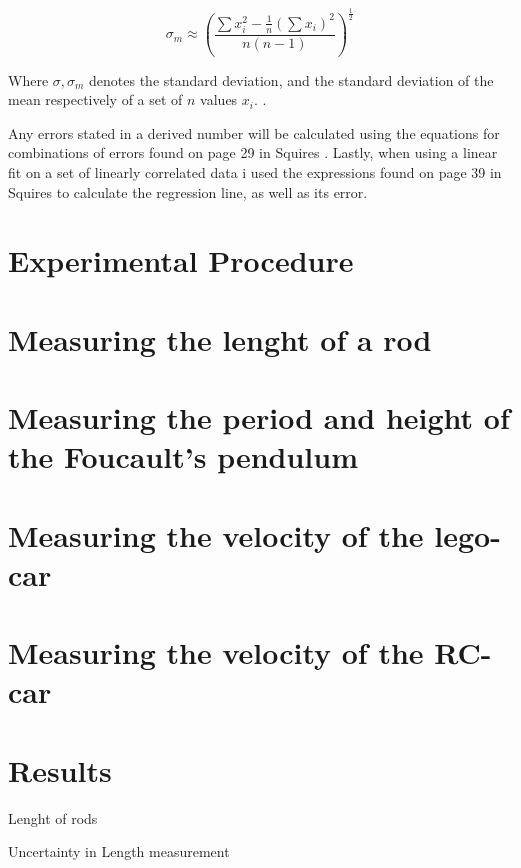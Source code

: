 \documentclass[%
 reprint,
 amsmath,amssymb,
 aps,
]{revtex4-1}
\begin{document}
    \begin{equation}
      \label{eqn:sigma_m}
      \sigma_m \approx \left(
      \frac{\sum x_i^2 - \frac{1}{n}(\sum x_i)^2}
      {n(n - 1)}
      \right)^\frac{1}{2}
    \end{equation}

    Where $\sigma, \sigma_m$ denotes the standard deviation, and the standard deviation of the mean respectively of a set of $n$ values $x_i$. \cite{squires}.

    Any errors stated in a derived number will be calculated using the equations for combinations of errors found on page 29 in Squires \cite{squires}. Lastly, when using a linear fit on a set of linearly correlated data i used the expressions found on page 39 in Squires \cite{squires} to calculate the regression line, as well as its error.

\section{\label{sec:exp_proced}Experimental Procedure}
  \section{Measuring the lenght of a rod}
  \section{Measuring the period and height of the Foucault's pendulum}
  \section{Measuring the velocity of the lego-car}
  \section{Measuring the velocity of the RC-car}

\section{\label{sec:data} Results}
  \begin{table}
    \caption{Lenght of rods}
    \label{tab:lenrods}
    
  \end{table}

  \begin{table}
    \caption{Uncertainty in Length measurement}
    \label{tab:uncert}
    
  \end{table}
  
\end{document}
